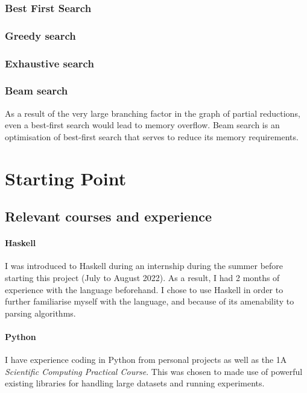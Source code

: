 \documentclass[12pt,a4paper,twoside,openright]{report}
\theoremstyle{definition}
\begin{document}
\subsubsection{Best First Search}
\subsubsection{Greedy search}
\subsubsection{Exhaustive search}
\subsubsection{Beam search}
As a result of the very large branching factor in the graph of partial reductions, even a best-first search would lead to memory overflow. Beam search is an optimisation of best-first search that serves to reduce its memory requirements. 




%

\section{Starting Point}

\subsection{Relevant courses and experience}

\paragraph{Haskell}{I was introduced to Haskell during an internship during the summer before starting this project (July to August 2022). As a result, I had 2 months of experience with the language beforehand. I chose to use Haskell in order to further familiarise myself with the language, and because of its amenability to parsing algorithms.}

\paragraph{Python}{I have experience coding in Python from personal projects as well as the 1A \textit{Scientific Computing Practical Course}. This was chosen to made use of powerful existing libraries for handling large datasets and running experiments. }
\end{document}
